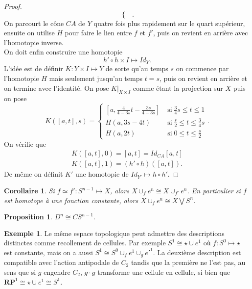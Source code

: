 \documentclass[12pt]{book}
\newtheorem{cor}[lemma]{Corollaire}
\newtheorem{prop}[lemma]{Proposition}
\theoremstyle{definition}
\newtheorem{example}[lemma]{Exemple}
\theoremstyle{remark}
\begin{document}
\begin{proof}
\[\begin{cases}
			\end{cases}
		.\] 
		On parcourt le cône $CA$ de $Y$ quatre fois plus rapidement sur le quart supérieur, ensuite on utilise $H$ pour faire le lien entre $f$ et $f'$, puis on revient en arrière avec l'homotopie inverse. \\
		On doit enfin construire une homotopie \[
			h'\circ h \times I \longmapsto Id_{Y}
		.\] 
		L'idée est de définir $K : Y \times I \longmapsto Y$ de sorte qu'au temps $s$ on commence par l'homotopie $H$ mais seulement jusqu'au temps $t=s$, puis on revient en arrière et on termine avec l'identité.
		On pose $K|_{X\times I}$ comme étant la projection sur $X$ puis on pose  \[
			K([a,t],s) = \begin{cases}
				[a, \frac{4}{4-3s}t-\frac{3s}{4-3s}] \; &\text{si} \; \frac{3}{4}s \le t \le 1 \\
				H(a,3s-4t) \; &\text{si} \; \frac{s}{2} \le t \le \frac{3}{4}s \\
				H(a,2t) \; &\text{si} \; 0 \le t \le \frac{s}{2}
			\end{cases}
		.\] 
		On vérifie que 
		\begin{align*}
			K([a,t],0) = [a,t] = Id_{CA}[a,t] \\
			K([a,t],1) = (h'\circ h)([a,t])
		.\end{align*}
		De même on définit $K'$ une homotopie de  $Id_{Y'} \longmapsto h \circ h'$.
	\end{proof}
	\begin{cor}
		Si $f \simeq f' : S^{n-1} \longmapsto X$, alors $X \cup_f e^n \cong X \cup_{f'}e^n$. En particulier si $f$ est homotope à une fonction constante, alors $X \cup_f e^n \cong X \bigvee S^n$.
	\end{cor}
	\begin{prop}
		$D^n \cong CS^{n-1}$.
	\end{prop}
	\begin{example}
		Le même espace topologique peut admettre des descriptions distinctes comme recollement de cellules. Par exemple $S^1 \cong \star \cup e^1$ où  $f : S^0 \longmapsto \star$ est constante, mais on a aussi $S^1 \cong S^0 \cup_f e^1 \cup_g e'^1$. La deuxième description est compatible avec l'action antipodale de $C_2$ tandis que la première ne l'est pas, au sens que si $g$ engendre  $C_2$,  $g \cdot g$ transforme une cellule en cellule, si bien que $\mathbf{RP}^1 \cong \star \cup e^1 \cong S^1$.
	\end{example}
\end{document}
